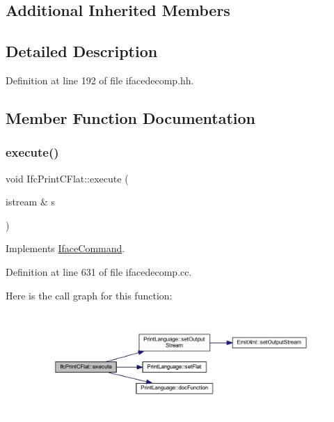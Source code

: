\subsection*{Additional Inherited Members}


\subsection{Detailed Description}


Definition at line 192 of file ifacedecomp.\+hh.



\subsection{Member Function Documentation}
\mbox{\label{class_ifc_print_c_flat_a11c64bab560c5aaee612235a4d84d785}} 
\subsubsection{\texorpdfstring{execute()}{execute()}}
{\footnotesize\ttfamily void Ifc\+Print\+C\+Flat\+::execute (\begin{DoxyParamCaption}\item[{istream \&}]{s }\end{DoxyParamCaption})\hspace{0.3cm}{\ttfamily [virtual]}}



Implements \mbox{\hyperlink{class_iface_command_af10e29cee2c8e419de6efe9e680ad201}{Iface\+Command}}.



Definition at line 631 of file ifacedecomp.\+cc.

Here is the call graph for this function\+:
\nopagebreak
\begin{figure}[H]
\begin{center}
\leavevmode
\includegraphics[width=350pt]{class_ifc_print_c_flat_a11c64bab560c5aaee612235a4d84d785_cgraph}
\end{center}
\end{figure}


